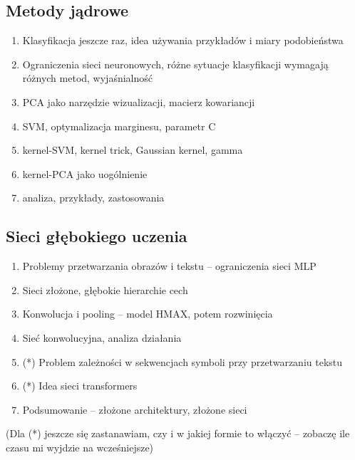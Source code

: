 \documentclass[10pt]{article}
\begin{document}
\subsection*{Metody jądrowe}

\begin{enumerate}
	\item Klasyfikacja jeszcze raz, idea używania przykładów i miary podobieństwa
	\item Ograniczenia sieci neuronowych, różne sytuacje klasyfikacji wymagają różnych metod, wyjaśnialność 
	\item PCA jako narzędzie wizualizacji, macierz kowariancji
	\item SVM, optymalizacja marginesu, parametr C
	\item kernel-SVM, kernel trick, Gaussian kernel, gamma 
	\item kernel-PCA jako uogólnienie
	\item analiza, przykłady, zastosowania
\end{enumerate}

\subsection*{Sieci głębokiego uczenia}

\begin{enumerate}
	\item Problemy przetwarzania obrazów i tekstu -- ograniczenia sieci MLP
	\item Sieci złożone, głębokie hierarchie cech 
	\item Konwolucja i pooling -- model HMAX, potem rozwinięcia 
	\item Sieć konwolucyjna, analiza działania
	\item (*) Problem zależności w sekwencjach symboli przy przetwarzaniu tekstu
	\item (*) Idea sieci transformers
	\item Podsumowanie -- złożone architektury, złożone sieci
\end{enumerate}

(Dla (*) jeszcze się zastanawiam, czy i w jakiej formie to włączyć -- zobaczę ile czasu mi wyjdzie na wcześniejsze)
\end{document}
